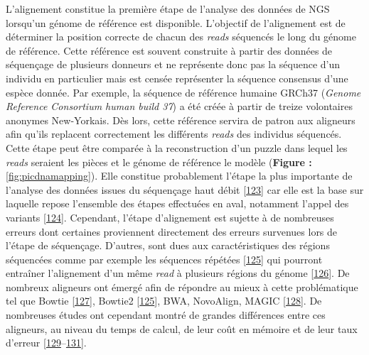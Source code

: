 \documentclass[12pt,twoside]{reedthesis}
\theoremstyle{definition}
\theoremstyle{definition}
\theoremstyle{remark}
\begin{document}
  L'alignement constitue la première étape de l'analyse des données de NGS
  lorsqu'un génome de référence est disponible. L'objectif de l'alignement
  est de déterminer la position correcte de chacun des \emph{reads}
  séquencés le long du génome de référence. Cette référence est souvent
  construite à partir des données de séquençage de plusieurs donneurs et
  ne représente donc pas la séquence d'un individu en particulier mais est
  censée représenter la séquence consensus d'une espèce donnée. Par
  exemple, la séquence de référence humaine GRCh37 (\emph{Genome Reference
  Consortium human build 37}) a été créée à partir de treize volontaires
  anonymes New-Yorkais. Dès lors, cette référence servira de patron aux
  aligneurs afin qu'ils replacent correctement les différents \emph{reads}
  des individus séquencés. Cette étape peut être comparée à la
  reconstruction d'un puzzle dans lequel les \emph{reads} seraient les
  pièces et le génome de référence le modèle (\textbf{Figure :
  }\ref{fig:picdnamapping}). Elle constitue probablement l'étape la plus
  importante de l'analyse des données issues du séquençage haut débit
  {[}\protect\hyperlink{ref-Flicek2009}{123}{]} car elle est la base sur
  laquelle repose l'ensemble des étapes effectuées en aval, notamment
  l'appel des variants {[}\protect\hyperlink{ref-Nielsen2011}{124}{]}.
  Cependant, l'étape d'alignement est sujette à de nombreuses erreurs dont
  certaines proviennent directement des erreurs survenues lors de l'étape
  de séquençage. D'autres, sont dues aux caractéristiques des régions
  séquencées comme par exemple les séquences répétées
  {[}\protect\hyperlink{ref-Langmead2012}{125}{]} qui pourront entraîner
  l'alignement d'un même \emph{read} à plusieurs régions du génome
  {[}\protect\hyperlink{ref-Treangen2013}{126}{]}. De nombreux aligneurs
  ont émergé afin de répondre au mieux à cette problématique tel que
  Bowtie {[}\protect\hyperlink{ref-Langmead2009}{127}{]}, Bowtie2
  {[}\protect\hyperlink{ref-Langmead2012}{125}{]}, BWA, NovoAlign, MAGIC
  {[}\protect\hyperlink{ref-Su2014}{128}{]}. De nombreuses études ont
  cependant montré de grandes différences entre ces aligneurs, au niveau
  du temps de calcul, de leur coût en mémoire et de leur taux d'erreur
  {[}\protect\hyperlink{ref-Ruffalo2011}{129}--\protect\hyperlink{ref-Bao2011}{131}{]}.
  
  \newpage
  
\end{document}
